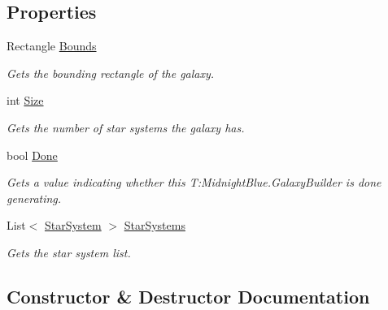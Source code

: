 \subsection*{Properties}
\begin{DoxyCompactItemize}
\item 
Rectangle \hyperlink{class_midnight_blue_1_1_galaxy_builder_a9051fa0f379b34dae5a6dcd287da7d9d}{Bounds}
\begin{DoxyCompactList}\small\item\em Gets the bounding rectangle of the galaxy. \end{DoxyCompactList}\item 
int \hyperlink{class_midnight_blue_1_1_galaxy_builder_a295af2d47a68bdac0845f3540c815a63}{Size}
\begin{DoxyCompactList}\small\item\em Gets the number of star systems the galaxy has. \end{DoxyCompactList}\item 
bool \hyperlink{class_midnight_blue_1_1_galaxy_builder_a4b496c6930a56d2469c21acb54ff23ec}{Done}
\begin{DoxyCompactList}\small\item\em Gets a value indicating whether this T\+:\+Midnight\+Blue.\+Galaxy\+Builder is done generating. \end{DoxyCompactList}\item 
List$<$ \hyperlink{class_midnight_blue_1_1_star_system}{Star\+System} $>$ \hyperlink{class_midnight_blue_1_1_galaxy_builder_a85ce4bbc7de1c14ad7e7f0af3e92c1a1}{Star\+Systems}
\begin{DoxyCompactList}\small\item\em Gets the star system list. \end{DoxyCompactList}\end{DoxyCompactItemize}


\subsection{Constructor \& Destructor Documentation}
\hypertarget{class_midnight_blue_1_1_galaxy_builder_a926e49d9c54675035304d7506c02a0b9}{}\label{class_midnight_blue_1_1_galaxy_builder_a926e49d9c54675035304d7506c02a0b9} 
